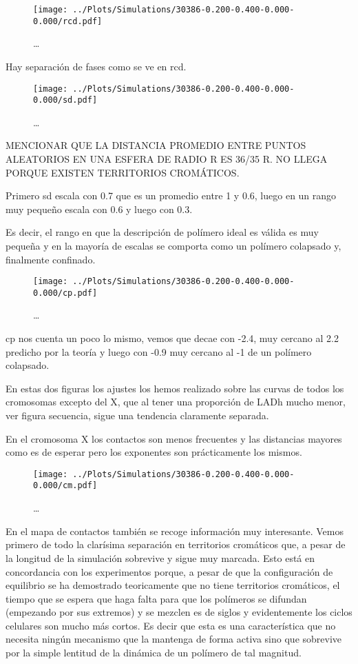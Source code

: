 \begin{figure}
    \centering
    \texttt{[image: ../Plots/Simulations/30386-0.200-0.400-0.000-0.000/rcd.pdf]}
    \caption{\dots}
    \label{fig:rcd_c}
\end{figure}

Hay separación de fases como se ve en rcd.

\begin{figure}
    \centering
    \texttt{[image: ../Plots/Simulations/30386-0.200-0.400-0.000-0.000/sd.pdf]}
    \caption{\dots}
    \label{fig:sd_c}
\end{figure}

MENCIONAR QUE LA DISTANCIA PROMEDIO ENTRE PUNTOS ALEATORIOS EN UNA ESFERA DE RADIO R ES 36/35 R. NO LLEGA PORQUE EXISTEN TERRITORIOS CROMÁTICOS.

Primero sd escala con 0.7 que es un promedio entre 1 y 0.6, luego en un rango muy pequeño escala con 0.6 y luego con 0.3.

Es decir, el rango en que la descripción de polímero ideal es válida es muy pequeña y en la mayoría de escalas se comporta como un polímero colapsado y, finalmente confinado.

\begin{figure}
    \centering
    \texttt{[image: ../Plots/Simulations/30386-0.200-0.400-0.000-0.000/cp.pdf]}
    \caption{\dots}
    \label{fig:cp_c}
\end{figure}

cp nos cuenta un poco lo mismo, vemos que decae con -2.4, muy cercano al 2.2 predicho por la teoría y luego con -0.9 muy cercano al -1 de un polímero colapsado.

En estas dos figuras los ajustes los hemos realizado sobre las curvas de todos los cromosomas excepto del X, que al tener una proporción de LADh mucho menor, ver figura secuencia, sigue una tendencia claramente separada.

En el cromosoma X los contactos son menos frecuentes y las distancias mayores como es de esperar pero los exponentes son prácticamente los mismos.

\begin{figure}
    \centering
    \texttt{[image: ../Plots/Simulations/30386-0.200-0.400-0.000-0.000/cm.pdf]}
    \caption{\dots}
    \label{fig:cm_c}
\end{figure}

En el mapa de contactos también se recoge información muy interesante. Vemos primero de todo la clarísima separación en territorios cromáticos que, a pesar de la longitud de la simulación sobrevive y sigue muy marcada. Esto está en concordancia con los experimentos porque, a pesar de que la configuración de equilibrio se ha demostrado teoricamente que no tiene territorios cromáticos, el tiempo que se espera que haga falta para que los polímeros se difundan (empezando por sus extremos) y se mezclen es de siglos y evidentemente los ciclos celulares son mucho más cortos. Es decir que esta es una característica que no necesita ningún mecanismo que la mantenga de forma activa sino que sobrevive por la simple lentitud de la dinámica de un polímero de tal magnitud.

